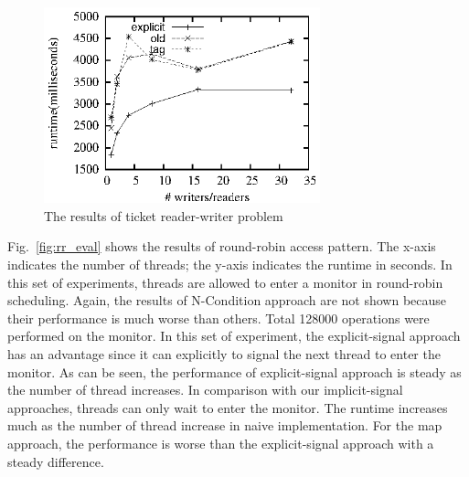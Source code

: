 \documentclass[preprint]{sigplanconf}
\begin{document}
%
\begin{figure}[ht!]
  \centering
  \includegraphics[width=80mm]{fig/trw.eps}
  \caption{The results of ticket reader-writer problem}
  \label{fig:rw_eval}
\end{figure}


%
Fig.~\ref{fig:rr_eval} shows the results of round-robin access pattern. The
x-axis indicates the number of threads; the y-axis indicates the
runtime in seconds. In this set of experiments, threads are allowed to enter a
monitor in round-robin scheduling. Again, the results of N-Condition approach
are not shown because their performance is much worse than others. Total 
128000 operations were performed on the monitor. In this set
of experiment, the explicit-signal approach has an advantage since it can
explicitly to signal the next thread to enter the monitor. As can be seen, the
performance of explicit-signal approach is steady as the number of thread
increases. In comparison with our implicit-signal approaches, threads can only 
wait to enter the monitor. The runtime increases much as the number of thread 
increase in naive implementation. For the map approach, the performance is 
worse than the explicit-signal approach with a steady difference. 
\end{document}
